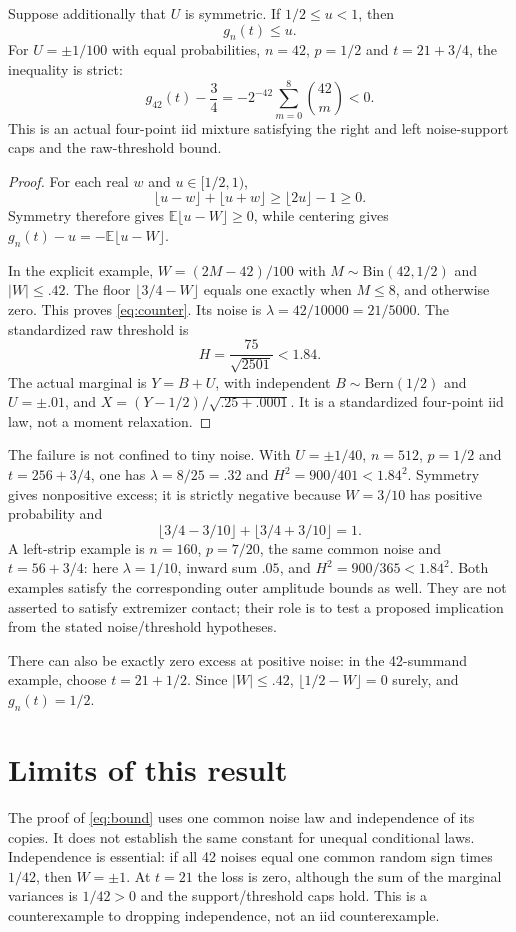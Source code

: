 \documentclass[11pt,a4paper]{article}
\newcommand{\E}{\mathbb E}\newcommand{\Pp}{\mathbb P}
\begin{document}
\begin{proposition}\label{prop:excess}
Suppose additionally that $U$ is symmetric. If $1/2\le u<1$, then
\[
                              g_n(t)\le u.
\]
For $U=\pm1/100$ with equal probabilities, $n=42$, $p=1/2$ and
$t=21+3/4$, the inequality is strict:
\begin{equation}\label{eq:counter}
 g_{42}(t)-\frac34
       =-2^{-42}\sum_{m=0}^{8}\binom{42}{m}<0.
\end{equation}
This is an actual four-point iid mixture satisfying the right and left
noise-support caps and the raw-threshold bound.
\end{proposition}
\begin{proof}
For each real $w$ and $u\in[1/2,1)$,
\[
 \lfloor u-w\rfloor+\lfloor u+w\rfloor
             \ge\lfloor2u\rfloor-1\ge0.
\]
Symmetry therefore gives $\E\lfloor u-W\rfloor\ge0$, while centering gives
$g_n(t)-u=-\E\lfloor u-W\rfloor$.

In the explicit example, $W=(2M-42)/100$ with
$M\sim\mathrm{Bin}(42,1/2)$ and $|W|\le.42$. The floor
$\lfloor3/4-W\rfloor$ equals one exactly when $M\le8$, and otherwise zero.
This proves \eqref{eq:counter}. Its noise is
$\lambda=42/10000=21/5000$. The standardized raw threshold is
\[
                         H=\frac{75}{\sqrt{2501}}<1.84.
\]
The actual marginal is $Y=B+U$, with independent $B\sim\mathrm{Bern}(1/2)$
and $U=\pm.01$, and $X=(Y-1/2)/\sqrt{.25+.0001}$.
It is a standardized four-point iid law, not a moment relaxation.
\end{proof}

The failure is not confined to tiny noise. With $U=\pm1/40$,
$n=512$, $p=1/2$ and $t=256+3/4$, one has $\lambda=8/25=.32$
and $H^2=900/401<1.84^2$. Symmetry gives nonpositive excess;
it is strictly negative because $W=3/10$ has positive probability and
\[
 \lfloor3/4-3/10\rfloor+\lfloor3/4+3/10\rfloor=1.
\]
A left-strip example is $n=160$, $p=7/20$, the same common noise and
$t=56+3/4$: here $\lambda=1/10$, inward sum $.05$, and
$H^2=900/365<1.84^2$. Both examples satisfy the corresponding outer
amplitude bounds as well. They are not asserted to satisfy extremizer
contact; their role is to test a proposed implication from the stated
noise/threshold hypotheses.

There can also be exactly zero excess at positive noise: in the
42-summand example, choose $t=21+1/2$. Since $|W|\le.42$,
$\lfloor1/2-W\rfloor=0$ surely, and $g_n(t)=1/2$.

\section{Limits of this result}
The proof of \eqref{eq:bound} uses one common noise law and independence
of its copies. It does not establish the same constant for unequal
conditional laws. Independence is essential: if all 42 noises equal one
common random sign times $1/42$, then $W=\pm1$. At $t=21$ the loss is
zero, although the sum of the marginal variances is $1/42>0$ and the
support/threshold caps hold. This is a counterexample to dropping
independence, not an iid counterexample.
\end{document}
